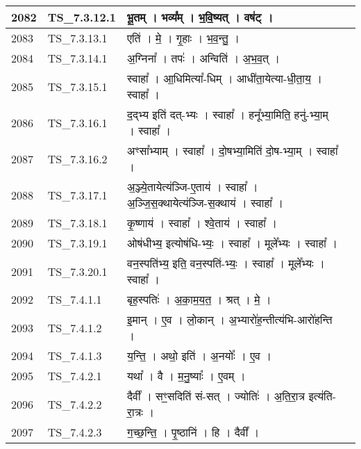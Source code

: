 \documentclass[17pt]{extarticle}
\begin{document}
\begin{longtable}{||p{0.4in}||p{0.9in}||p{4.0in}||p{0.9in}||}
        \hline
            2082 & TS\_7.3.12.1 & भू॒तम्   ।   भव्य᳚म्   ।   भ॒वि॒ष्यत्   ।   वष॑ट्   ।    &      \\
        \hline
            2083 & TS\_7.3.13.1 & एति॑   ।   मे॒   ।   गृ॒हाः   ।   भ॒व॒न्तु॒   ।    &      \\
        \hline
            2084 & TS\_7.3.14.1 & अ॒ग्निना᳚   ।   तपः॑   ।   अन्विति॑   ।   अ॒भ॒व॒त्   ।    &      \\
        \hline
            2085 & TS\_7.3.15.1 & स्वाहा᳚   ।   आ॒धिमित्या᳚{-}धिम्   ।   आधी॑ता॒येत्या{-}धी॒ता॒य॒   ।   स्वाहा᳚   ।    &      \\
        \hline
            2086 & TS\_7.3.16.1 & द॒द्भ्य इति॑ दत्{-}भ्यः   ।   स्वाहा᳚   ।   हनू᳚भ्या॒मिति॒ हनु॑{-}भ्या॒म्   ।   स्वाहा᳚   ।    &      \\
        \hline
            2087 & TS\_7.3.16.2 & अꣳसा᳚भ्याम्   ।   स्वाहा᳚   ।   दो॒षभ्या॒मिति॑ दो॒ष{-}भ्या॒म्   ।   स्वाहा᳚   ।    &      \\
        \hline
            2088 & TS\_7.3.17.1 & अ॒ञ्ज्ये॒तायेत्य॑ञ्जि{-}ए॒ताय॑   ।   स्वाहा᳚   ।   अ॒ञ्जि॒स॒क्थायेत्य॑ञ्जि{-}स॒क्थाय॑   ।   स्वाहा᳚   ।    &      \\
        \hline
            2089 & TS\_7.3.18.1 & कृ॒ष्णाय॑   ।   स्वाहा᳚   ।   श्वे॒ताय॑   ।   स्वाहा᳚   ।    &      \\
        \hline
            2090 & TS\_7.3.19.1 & ओष॑धीभ्य॒ इत्योष॑धि{-}भ्यः॒   ।   स्वाहा᳚   ।   मूले᳚भ्यः   ।   स्वाहा᳚   ।    &      \\
        \hline
            2091 & TS\_7.3.20.1 & वन॒स्पति॑भ्य॒ इति॒ वन॒स्पति॑{-}भ्यः॒   ।   स्वाहा᳚   ।   मूले᳚भ्यः   ।   स्वाहा᳚   ।    &      \\
        \hline
            2092 & TS\_7.4.1.1 & बृह॒स्पतिः॑   ।   अ॒का॒म॒य॒त॒   ।   श्रत्   ।   मे॒   ।    &      \\
        \hline
            2093 & TS\_7.4.1.2 & इ॒मान्   ।   ए॒व   ।   लो॒कान्   ।   अ॒भ्यारो॑ह॒न्तीत्य॑भि{-}आरो॑हन्ति   ।    &      \\
        \hline
            2094 & TS\_7.4.1.3 & य॒न्ति॒   ।   अथो॒ इति॑   ।   अ॒नयोः᳚   ।   ए॒व   ।    &      \\
        \hline
            2095 & TS\_7.4.2.1 & यथा᳚   ।   वै   ।   म॒नु॒ष्याः᳚   ।   ए॒वम्   ।    &      \\
        \hline
            2096 & TS\_7.4.2.2 & दैवी᳚   ।   सꣳ॒॒सदिति॑ सं{-}सत्   ।   ज्योतिः॑   ।   अ॒ति॒रा॒त्र इत्य॑ति{-}रा॒त्रः   ।    &      \\
        \hline
            2097 & TS\_7.4.2.3 & ग॒च्छ॒न्ति॒   ।   पृ॒ष्ठानि॑   ।   हि   ।   दैवी᳚   ।    &      \\

\end{longtable}
\end{document}

